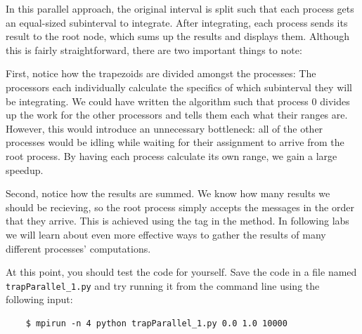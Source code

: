   
  
  In this parallel approach, the original interval is split such that each process gets an equal-sized subinterval to integrate. After integrating, each process sends its result to the root node, which sums up the results and displays them. Although this is fairly straightforward, there are two important things to note:

  First, notice how the trapezoids are divided amongst the processes: The processors each individually calculate the specifics of which subinterval they will be integrating. We could have written the algorithm such that process 0 divides up the work for the other processors and tells them each what their ranges are. However, this would introduce an unnecessary bottleneck: all of the other processes would be idling while waiting for their assignment to arrive from the root process. By having each process calculate its own range, we gain a large speedup.

  Second, notice how the results are summed. We know how many results we should be recieving, so the root process simply accepts the messages in the order that they arrive. This is achieved using the tag  in the  method. In following labs we will learn about even more effective ways to gather the results of many different processes' computations.


  At this point, you should test the code for yourself. Save the code in a file named \texttt{trapParallel\_1.py} and try running it from the command line using the following input: 

  \begin{verbatim}
    $ mpirun -n 4 python trapParallel_1.py 0.0 1.0 10000
  \end{verbatim}

